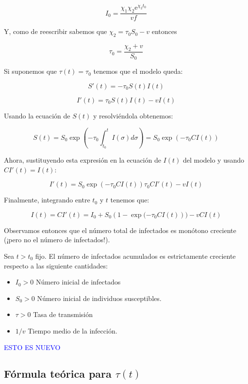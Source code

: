 \begin{equation}
I_0=\frac{\chi_1\chi_2\mathrm{e}^{\chi_2 t_0}}{vf}
\end{equation}

Y, como de reescribir sabemos que $\chi_2 = \tau_0 S_0-v$ entonces

\begin{equation}
\tau_0 = \frac{\chi_2+v}{S_0}
\end{equation}

Si suponemos que $\tau (t) = \tau_0$ tenemos que el modelo queda:

\begin{equation}
S'(t) = -\tau_0S(t)I(t)
\end{equation}

\begin{equation}
I'(t) = \tau_0S(t)I(t) -vI(t)
\end{equation}

Usando la ecuación de $S(t)$ y resolviéndola obtenemos:

$$S(t) = S_0\exp{\left( -\tau_0 \int_{t_0}^t I(\sigma ) d\sigma \right)} = S_0\exp{(-\tau_0 CI(t))}$$

Ahora, sustituyendo esta expresión en la ecuación de $I(t)$ del modelo y usando $CI'(t)=I(t)$:

$$I'(t) = S_0\exp{\left( -\tau_0 CI(t)\right) }\tau_0 CI'(t)-vI(t)$$

Finalmente, integrando entre $t_0$ y $t$ tenemos que:

$$I(t)=CI'(t)=I_0+S_0(1-\exp{(-\tau_0 CI(t)}))-vCI(t)$$

Observamos entonces que el número total de infectados es monótono creciente (¡pero no el número de infectados!). 

\begin{theorem}
Sea $t>t_0$ fijo. El número de infectados acumulados es estrictamente creciente respecto a las siguiente cantidades:
\begin{itemize}
\item $I_0>0$ Número inicial de infectados
\item $S_0>0$ Número inicial de individuos susceptibles.
\item $\tau>0$ Tasa de transmisión
\item $1/v$ Tiempo medio de la infección.
\end{itemize}
\end{theorem}

\textcolor{blue}{ESTO ES NUEVO}

\subsection{Fórmula teórica para $\tau (t)$}

